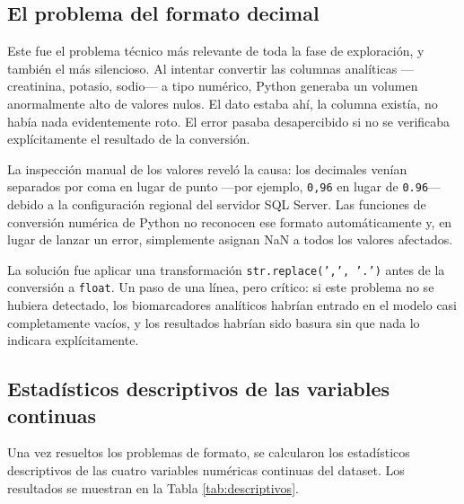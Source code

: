 \documentclass[12pt, a4paper, oneside]{report}
\begin{document}
\subsection{El problema del formato decimal}

Este fue el problema técnico más relevante de toda la fase de exploración, y también el más silencioso. Al intentar convertir las columnas analíticas —creatinina, potasio, sodio— a tipo numérico, Python generaba un volumen anormalmente alto de valores nulos. El dato estaba ahí, la columna existía, no había nada evidentemente roto. El error pasaba desapercibido si no se verificaba explícitamente el resultado de la conversión.

La inspección manual de los valores reveló la causa: los decimales venían separados por coma en lugar de punto —por ejemplo, \texttt{0,96} en lugar de \texttt{0.96}— debido a la configuración regional del servidor SQL Server. Las funciones de conversión numérica de Python no reconocen ese formato automáticamente y, en lugar de lanzar un error, simplemente asignan NaN a todos los valores afectados.

La solución fue aplicar una transformación \texttt{str.replace(',', '.')} antes de la conversión a \texttt{float}. Un paso de una línea, pero crítico: si este problema no se hubiera detectado, los biomarcadores analíticos habrían entrado en el modelo casi completamente vacíos, y los resultados habrían sido basura sin que nada lo indicara explícitamente.

\subsection{Estadísticos descriptivos de las variables continuas}

Una vez resueltos los problemas de formato, se calcularon los estadísticos descriptivos de las cuatro variables numéricas continuas del dataset. Los resultados se muestran en la Tabla \ref{tab:descriptivos}.
\end{document}
